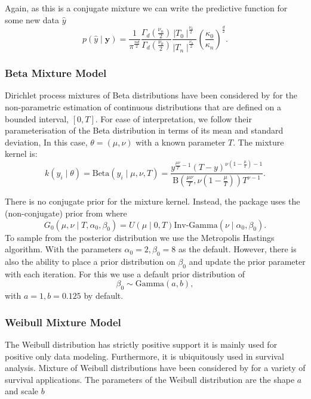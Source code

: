 \documentclass[nojss]{jss}
\begin{document}
Again, as this is a conjugate mixture we can write the predictive function for some new data $\hat{y}$
\begin{equation}
p(\hat{y} \mid \mathbf{y}  ) = \frac{1}{\pi ^{\frac{nd}{2}}} \frac{\Gamma _d ( \frac{\nu _n}{2})}{\Gamma _d (\frac{\nu _0}{2})}  \frac{\mid T_0 \mid ^ \frac{\nu _0}{2}}{\mid T_n \mid ^ \frac{\nu _n}{2}} \left(  \frac{\kappa _0}{\kappa _n} \right)  ^\frac{d}{2}.
\end{equation}

\subsubsection{Beta Mixture Model}
Dirichlet process mixtures of Beta distributions have been considered by \cite{kottas_dirichlet_2006} for the non-parametric estimation of continuous distributions that are defined on a bounded interval, $\left[0, T \right]$. For ease of interpretation, we follow their parameterisation of the Beta distribution in terms of its mean and standard deviation, In this case, $\theta = (\mu,\nu)$ with a known parameter $T$. The mixture kernel is:
\begin{equation}
k(y_i \mid \theta) = \text{Beta} (y_i \mid \mu, \nu, T) = \frac{y^{\frac{\mu \nu}{T} - 1} (T-y)^{\nu (1- \frac{\mu}{T})-1}}{\text{B}(\frac{\mu \nu}{T}, \nu(1-\frac{\mu}{T})) T^{\nu -1}}.
\end{equation}

There is no conjugate prior for the mixture kernel. Instead, the  package uses the (non-conjugate) prior from \cite{kottas_dirichlet_2006} where
\begin{equation}
G_0 (\mu , \nu \mid T, \alpha _0 , \beta _0) = U(\mu \mid 0, T) \text{Inv-Gamma} (\nu \mid \alpha _0, \beta _0).
\end{equation}
To sample from the posterior distribution we use the Metropolis Hastings algorithm. With the parameters $\alpha _0 = 2, \beta _0 =8$ as the default. However, there is also the ability to place a prior distribution on $\beta _0$ and update the prior parameter with each iteration. For this we use a default prior distribution of
\begin{equation}
\beta _0 \sim \text{Gamma} (a, b),
\end{equation}
with $a=1, b=0.125$ by default.

\subsubsection{Weibull Mixture Model}
The Weibull distribution has strictly positive support it is mainly used for positive only data modeling. Furthermore, it is ubiquitously used in survival analysis. Mixture of Weibull distributions have been considered by \cite{kottas_dirichlet_2006} for a variety of survival applications.
The parameters of the Weibull distribution are the shape $a$ and scale $b$
\end{document}
